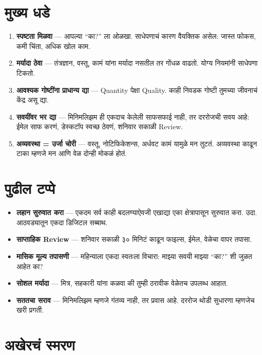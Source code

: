 \section*{मुख्य धडे}

\begin{enumerate}
  \item \textbf{स्पष्टता मिळवा} — आपल्या “का?” ला ओळखा. साधेपणाचं कारण वैयक्तिक असेल: जास्त फोकस, कमी चिंता, अधिक खोल काम.  
  \item \textbf{मर्यादा ठेवा} — तंत्रज्ञान, वस्तू, कामं यांना मर्यादा नसतील तर गोंधळ वाढतो. योग्य नियमांनी साधेपणा टिकतो.  
  \item \textbf{आवश्यक गोष्टींना प्राधान्य द्या} — Quantity पेक्षा Quality. काही निवडक गोष्टी तुमच्या जीवनाचं केंद्र असू द्या.  
  \item \textbf{सवयींवर भर द्या} — मिनिमलिझम ही एकदाच केलेली साफसफाई नाही, तर दररोजची सवय आहे: ईमेल साफ करणं, डेस्कटॉप स्वच्छ ठेवणं, शनिवार सकाळी Review.  
  \item \textbf{अव्यवस्था = उर्जा चोरी} — वस्तू, नोटिफिकेशन्स, अर्धवट कामं यामुळे मन तुटतं. अव्यवस्था काढून टाका म्हणजे मन आणि वेळ दोन्ही मोकळं होतं.  
\end{enumerate}

\section*{पुढील टप्पे}

\begin{itemize}
  \item \textbf{लहान सुरुवात करा} — एकदम सर्व काही बदलण्याऐवजी एखाद्या एका क्षेत्रापासून सुरुवात करा. उदा. आठवड्यातून एकदा डिजिटल सब्बाथ.  
  \item \textbf{साप्ताहिक Review} — शनिवार सकाळी ३० मिनिटं काढून फाइल्स, ईमेल, वेळेचा वापर तपासा.  
  \item \textbf{मासिक मूल्य तपासणी} — महिन्याला एकदा स्वतःला विचारा: माझ्या सवयी माझ्या “का?” शी जुळत आहेत का?  
  \item \textbf{सोशल मर्यादा} — मित्र, सहकारी यांना कळवा की तुम्ही ठरावीक वेळेतच उपलब्ध आहात.  
  \item \textbf{सततचा सराव} — मिनिमलिझम म्हणजे गंतव्य नाही, तर प्रवास आहे. दररोज थोडी सुधारणा म्हणजेच खरी प्रगती.  
\end{itemize}

\section*{अखेरचं स्मरण}

